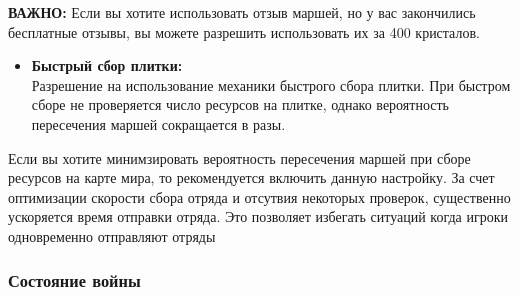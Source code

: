 \documentclass[
]{article}
\providecommand{\tightlist}{%
  \setlength{\itemsep}{0pt}\setlength{\parskip}{0pt}}
\begin{document}
\textbf{{ВАЖНО:}} Если вы хотите использовать отзыв маршей, но у вас
закончились бесплатные отзывы, вы можете разрешить использовать их за
400 кристалов.

\begin{itemize}
\tightlist
\item
  \textbf{Быстрый сбор плитки:}\\
  Разрешение на использование механики быстрого сбора плитки. При
  быстром сборе не проверяется число ресурсов на плитке, однако
  вероятность пересечения маршей сокращается в разы.
\end{itemize}

Если вы хотите минимзировать вероятность пересечения маршей при сборе
ресурсов на карте мира, то рекомендуется включить данную настройку. За
счет оптимизации скорости сбора отряда и отсутвия некоторых проверок,
существенно ускоряется время отправки отряда. Это позволяет избегать
ситуаций когда игроки одновременно отправляют отряды

\subsubsection{Состояние
войны}\label{ux441ux43eux441ux442ux43eux44fux43dux438ux435-ux432ux43eux439ux43dux44b-1}
\end{document}
